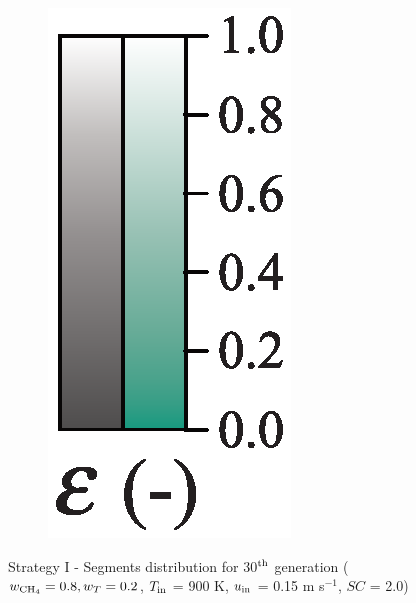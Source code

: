 \documentclass[preprint,12pt]{elsarticle}
\begin{document}
\begin{figure}[h!]
\begin{subfigure}[b]{0.1\textwidth}
     	\includegraphics[width=\textwidth]{segments_porosity.eps}
     \end{subfigure}
\caption{\label{fig:30L6040G1-TField} Strategy I - Segments distribution for 30$^{\rm{th}}$ generation ($w_{\rm{CH_4}} = 0.8, w_T = 0.2$, $T_{\rm{in}}$ = 900 K, $u_{\rm{in}}$ = 0.15 m s$^{-1}$, $SC$ = 2.0)}
\end{figure}
\end{document}
